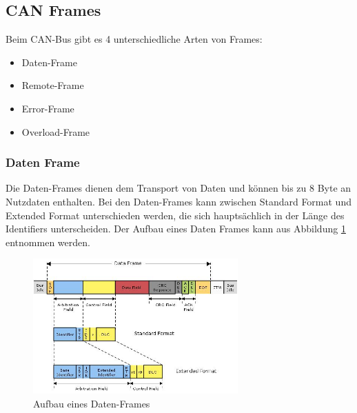 \subsection{CAN Frames} Beim CAN-Bus gibt es 4 unterschiedliche Arten
von Frames: 
\begin{itemize} 
\item Daten-Frame 
\item Remote-Frame 
\item Error-Frame 
\item Overload-Frame 
\end{itemize} 

\subsubsection{Daten Frame} 
Die Daten-Frames dienen dem Transport von Daten und können bis
zu 8 Byte an Nutzdaten enthalten. Bei den Daten-Frames kann zwischen
Standard Format und Extended Format unterschieden werden, die sich
hauptsächlich in der Länge des Identifiers unterscheiden. Der Aufbau
eines Daten Frames kann aus Abbildung \ref{data} entnommen werden.
	
\begin{figure}[h] 
\centering
\includegraphics[width=0.7\textwidth]{figures/data-frame}
\caption{Aufbau eines Daten-Frames \citep{HYC}} 
\label{data}
\end{figure} 
		
